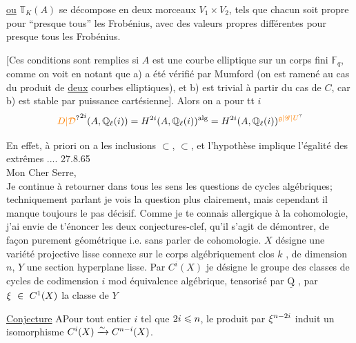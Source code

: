 \uline{ou} $\mathbb T_K(A)$ se décompose en deux morceaux
$V_1\times V_2$, tels que chacun soit propre pour ``presque
tous'' les Frobénius, avec des valeurs propres
différentes pour presque tous les Frobénius.

[Ces conditions sont remplies si $A$ est une 
 courbe elliptique  sur un corps fini $\mathbb F_q$,
comme on voit en notant que a) 
a été vérifié par Mumford (on est ramené
au cas du produit de \uline{deux} courbes
elliptiques), et b) est trivial à partir du
cas de $C$, car b) est stable par 
puissance cartésienne]. Alors on a pour tt $i$
\[
\unsure{D|\mathcal D}^{2i}(A,\mathbb Q_\ell(i))=H^{2i}(A,\mathbb Q_\ell(i))^{\mathrm{alg}}=H^{2i}(A,\mathbb Q_\ell(i))^{\unsure{\mathfrak g|\mathscr G|U}}
\]

En effet,  à priori on a les
inclusions $\subset$, $\subset$, et l'hypothèse implique
l'égalité des extrêmes ....
27.8.65\\

Mon Cher Serre,\\

Je continue à retourner dans tous les sens les questions de cycles
algébriques; techniquement parlant je vois la question plus clairement, mais
cependant il manque toujours le pas décisif. Comme je te connais allergique
à la cohomologie, j'ai envie de t'énoncer les deux conjectures-clef, qu'il
s'agit de démontrer, de façon purement géométrique i.e. sans parler de
cohomologie. $X$ désigne une variété projective lisse connexe sur le corps
algébriquement clos $k$ , de dimension $n$, $Y$ une section hyperplane lisse.
Par $C^i(X)$ je désigne le groupe des classes de cycles de codimension $i$
mod équivalence algébrique, tensorisé par $\underline{\mathrm Q}$ , par $\handwritten{\xi}\ \handwritten{\in}\ C^1(X)$ la classe
de $Y$

\uline{Conjecture} A\qquad Pour tout entier $i$ tel que $2i\leqslant n$, le produit par $\xi^{n-2i}$
induit un isomorphisme $C^i(X)\xrightarrow{\sim}C^{n-i}(X)$.

